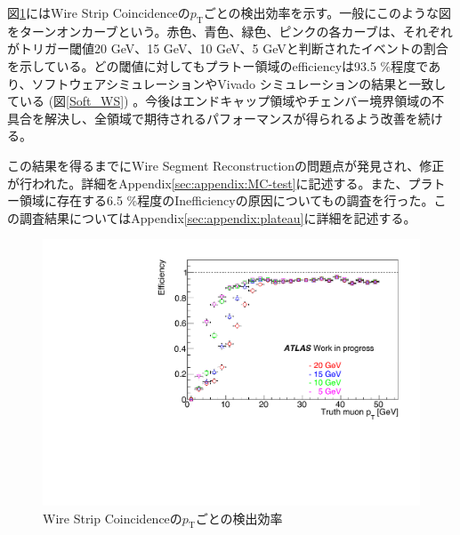 図\ref{SM_A_WS_turnon}にはWire Strip Coincidenceの$p_\mathrm{T}$ごとの検出効率を示す。一般にこのような図をターンオンカーブという。赤色、青色、緑色、ピンクの各カーブは、それぞれがトリガー閾値20 GeV、15 GeV、10 GeV、5 GeVと判断されたイベントの割合を示している。どの\pt 閾値に対してもプラトー領域のefficiencyは93.5 \%程度であり、ソフトウェアシミュレーションやVivado シミュレーションの結果と一致している (図\ref{Soft_WS}) 。今後はエンドキャップ領域やチェンバー境界領域の不具合を解決し、全領域で期待されるパフォーマンスが得られるよう改善を続ける。

この結果を得るまでにWire Segment Reconstructionの問題点が発見され、修正が行われた。詳細をAppendix\ref{sec:appendix:MC-test}に記述する。また、プラトー領域に存在する6.5 \%程度のInefficiencyの原因についてもの調査を行った。この調査結果についてはAppendix\ref{sec:appendix:plateau}に詳細を記述する。

\begin{figure} 
\centering
\includegraphics[width=16cm]{fig/Test/A_SM_ws_turnon.pdf}
\caption[]{Wire Strip Coincidenceの$p_\mathrm{T}$ごとの検出効率}
\label{SM_A_WS_turnon}
\end{figure}




